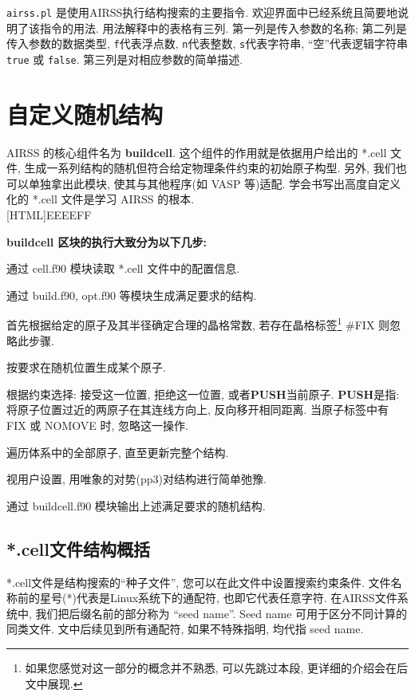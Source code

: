 \documentclass[a4paper, 10pt]{article}
\begin{document}
\verb|airss.pl| 是使用AIRSS执行结构搜索的主要指令. 欢迎界面中已经系统且简要地说明了该指令的用法. 用法解释中的表格有三列. 第一列是传入参数的名称; 第二列是传入参数的数据类型, \verb|f|代表浮点数, \verb|n|代表整数, \verb|s|代表字符串, ``空''代表逻辑字符串 \verb!true! 或 \verb!false!. 第三列是对相应参数的简单描述.

\newpage
\section{自定义随机结构}
AIRSS 的核心组件名为 \textbf{buildcell}. 这个组件的作用就是依据用户给出的 *.cell 文件, 生成一系列结构的随机但符合给定物理条件约束的初始原子构型. 另外, 我们也可以单独拿出此模块, 使其与其他程序(如 VASP 等)适配. 学会书写出高度自定义化的 *.cell 文件是学习 AIRSS 的根本.\\


\noindent{}[HTML]{EEEEFF}{\parbox{\textwidth}{%
\noindent \textbf{buildcell 区块的执行大致分为以下几步:}
\begin{maineu}
\item 通过 cell.f90 模块读取 *.cell 文件中的配置信息.
\item 通过 build.f90, opt.f90 等模块生成满足要求的结构. 
  \begin{subeu}
    \item 首先根据给定的原子及其半径确定合理的晶格常数, 若存在晶格标签\footnote{如果您感觉对这一部分的概念并不熟悉, 可以先跳过本段, 更详细的介绍会在后文中展现.} \#FIX 则忽略此步骤.
    \item 按要求在随机位置生成某个原子.
    \item 根据约束选择: 接受这一位置, 拒绝这一位置, 或者\textbf{PUSH}当前原子. \textbf{PUSH}是指: 将原子位置过近的两原子在其连线方向上, 反向移开相同距离. 当原子标签中有 FIX 或 NOMOVE 时, 忽略这一操作.
    \item 遍历体系中的全部原子, 直至更新完整个结构.
    \item 视用户设置, 用唯象的对势(pp3)对结构进行简单弛豫.
  \end{subeu}
\item 通过 buildcell.f90 模块输出上述满足要求的随机结构.
\end{maineu}}}

\subsection{*.cell文件结构概括}
*.cell文件是结构搜索的``种子文件'', 您可以在此文件中设置搜索约束条件. 文件名称前的星号(*)代表是Linux系统下的通配符, 也即它代表任意字符. 在AIRSS文件系统中, 我们把后缀名前的部分称为 ``seed name''. Seed name 可用于区分不同计算的同类文件. 文中后续见到所有通配符, 如果不特殊指明, 均代指 seed name.
\end{document}
